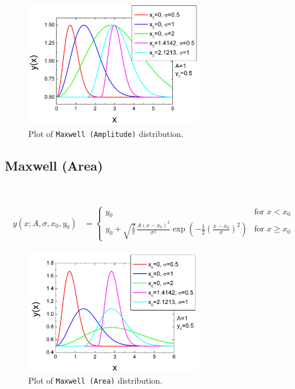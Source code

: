 \begin{figure}[htb]
\begin{center}
\includegraphics[width=0.6824\textwidth]{MaxwellAmplitude.png}
\end{center}
\caption{Plot of \texttt{Maxwell (Amplitude)} distribution.}
\label{fig:MaxwellAmplitude}
\end{figure}

\clearpage
\subsection{Maxwell (Area)} ~\\
\label{sec:MaxwellArea}

\begin{align}
y(x;A,\sigma,x_0,y_0) &=
\begin{cases}
y_0 & \mbox{for~} x < x_0 \\
y_0 +  \sqrt{\frac{2}{\pi}} \frac{A\left(x-x_0\right)^2}{\sigma^3}
        \exp\left(-\frac{1}{2}\left(\frac{x-x_0}{\sigma}\right)^2\right)
& \mbox{for~} x \geq x_0
\end{cases}
\end{align}

\begin{figure}[htb]
\begin{center}
\includegraphics[width=0.6824\textwidth]{MaxwellArea.png}
\end{center}
\caption{Plot of \texttt{Maxwell (Area)} distribution.}
\label{fig:MaxwellArea}
\end{figure}

